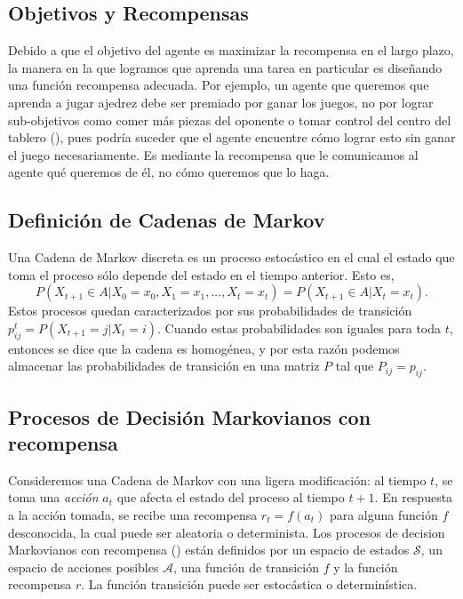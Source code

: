 \documentclass[11pt]{article}
\theoremstyle{plain}
\begin{document}
\subsection{Objetivos y Recompensas}
Debido a que el objetivo del agente es maximizar la recompensa en el largo plazo, la manera en la que logramos que aprenda una tarea en particular es diseñando una función recompensa adecuada. Por ejemplo, un agente que queremos que aprenda a jugar ajedrez debe ser premiado por ganar los juegos, no por lograr sub-objetivos como comer más piezas del oponente o tomar control del centro del tablero (\cite{sutton1998reinforcement}), pues podría suceder que el agente encuentre cómo lograr esto sin ganar el juego necesariamente. Es mediante la recompensa que le comunicamos al agente qué queremos de él, no cómo queremos que lo haga.
\subsection{Definición de Cadenas de Markov}
Una Cadena de Markov discreta es un proceso estocástico en el cual el estado que toma el proceso sólo depende del estado en el tiempo anterior. Esto es, 
\[P(X_{t+1} \in A | X_0=x_0, X_1=x_1 , ... , X_t=x_t) = P(X_{t+1} \in A | X_t = x_t).\]
Estos procesos quedan caracterizados por sus probabilidades de transición $p^t_{ij}=P(X_{t+1}=j | X_{t}=i)$. Cuando estas probabilidades son iguales para toda $t$, entonces se dice que la cadena es homogénea, y por esta razón podemos almacenar las probabilidades de transición en una matriz $P$ tal que $P_{ij}=p_{ij}$.
\subsection{Procesos de Decisión Markovianos con recompensa}
Consideremos una Cadena de Markov con una ligera modificación: al tiempo $t$, se toma una \textit{acción} $a_t$ que afecta el estado del proceso al tiempo $t+1$. En respuesta a la acción tomada, se recibe una recompensa $r_t = f(a_t)$ para alguna función $f$ desconocida, la cual puede ser aleatoria o determinista.
Los procesos de decision Markovianos con recompensa (\cite{Puterman:1994:MDP:528623}) están definidos por un espacio de estados $\mathcal{S}$, un espacio de acciones posibles $\mathcal{A}$, una función de transición $f$ y la función recompensa $r$. La función transición puede ser estocástica o determinística. 
\end{document}
